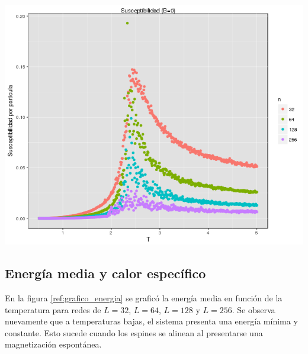 \documentclass[%
 reprint,
 amsmath,amssymb,
 aps,
spanish]{revtex4-1}
\begin{document}
\begin{minipage}{0.45\textwidth}									
\centering
\includegraphics[totalheight=0.25\textheight]{imagenes/con_corona/susceptibilidad.png}
\label{grafico_susceptibilidad_magnetica}
\end{minipage}

\subsection{Energía media y calor específico}

En la figura \ref{ref:grafico_energia} se graficó la energía media en función de la temperatura para redes de $L=32$, $L=64$, $L=128$ y $L=256$. Se observa nuevamente que a temperaturas bajas, el sistema presenta una energía mínima y constante. Esto sucede cuando los espines se alinean al presentarse una magnetización espontánea.
\end{document}
